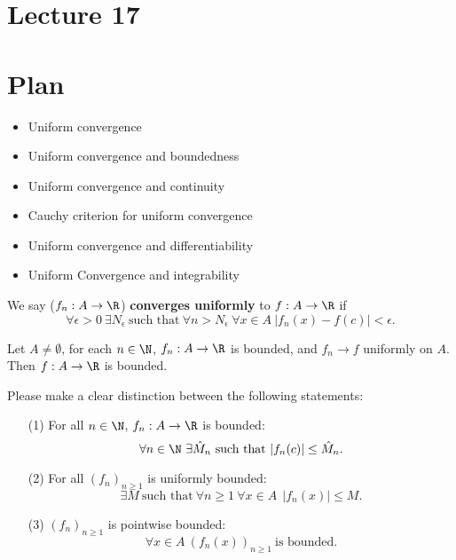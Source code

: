 \section{Lecture 17}

\section{Plan}

\begin{itemize}
    \item Uniform convergence
    \item Uniform convergence and boundedness
    \item Uniform convergence and continuity
    \item Cauchy criterion for uniform convergence
    \item Uniform convergence and differentiability
    \item Uniform Convergence and integrability
\end{itemize}

\begin{definition}
    We say (\( {f}_{n} : A \to \R  \)) \textbf{converges uniformly} to \( f: A \to \R  \) if 
    \[  \forall \epsilon > 0 \ \exists {N}_{\epsilon} \ \text{such that} \ \forall n > {N}_{\epsilon} \ \forall x \in A \ | {f}_{n}(x) - f(c) |  < \epsilon. \]
\end{definition}

\begin{theorem}
    Let \( A \neq \emptyset  \), for each \( n \in \N \), \( {f}_{n}: A \to \R  \) is bounded, and \( {f}_{n} \to f  \) uniformly on \( A  \). Then \( f : A \to \R  \) is bounded.
\end{theorem}

\begin{remark}
    Please make a clear distinction between the following statements:
    \begin{enumerate}
        \item[(1)] For all \( n \in \N \), \( {f}_{n}: A \to \R  \) is bounded:
            \[  \forall n \in \N \ \exists \hat{M}_n \ \text{such that} \ | {f}_{n}(c) |  \leq \hat{M}_n. \]
        \item[(2)] For all \( ({f}_{n})_{n \geq 1 } \) is uniformly bounded:
            \[  \exists M \ \text{such that} \ \forall n \geq 1 \ \forall x \in A \ \ | {f}_{n}(x) |  \leq M.  \]
        \item[(3)] \( ({f}_{n})_{n \geq 1 } \) is pointwise bounded:
            \[ \forall x \in A \ ({f}_{n}(x))_{n \geq 1 } \ \text{is bounded}. \]
    \end{enumerate}
\end{remark}

